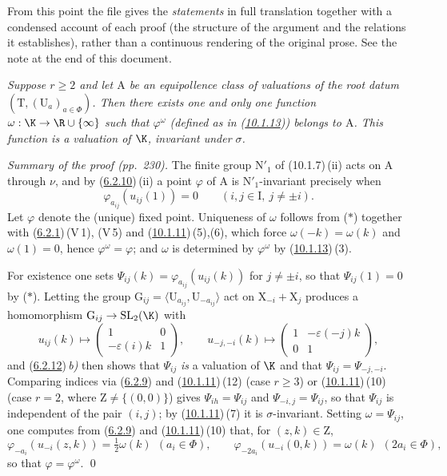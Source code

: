 \documentclass[12pt,a4paper,oneside,english]{smfart}
\makeatletter
\newcommand{\btanchor}[1]{\leavevmode\Hy@raisedlink{\hypertarget{bt:#1}{}}}
\newcommand{\btref}[1]{\hyperlink{bt:#1}{#1}}
\theoremstyle{definition}
\theoremstyle{bt}
\makeatother
\begin{document}

\btanchor{10.1.34}

\noindent\small
From this point the file gives the \emph{statements} in full translation
together with a condensed account of each proof (the structure of the argument
and the relations it establishes), rather than a continuous rendering of the
original prose. See the note at the end of this document.
\normalsize

\emph{Suppose $r\geqslant 2$ and let $\mathrm{A}$ be an equipollence class of
valuations of the root datum $(\mathrm{T},(\mathrm{U}_a)_{a\in\Phi})$. Then
there exists one and only one function $\omega:\K\to\R\cup\{\infty\}$ such that
$\varphi^{\omega}$ (defined as in (\btref{10.1.13})) belongs to $\mathrm{A}$. This
function is a valuation of $\K$, invariant under $\sigma$.}

\pf
\emph{Summary of the proof (pp.~230).} The finite group $\mathrm{N}'_1$ of
(10.1.7)\,(ii) acts on $\mathrm{A}$ through $\nu$, and by (\btref{6.2.10})\,(ii) a point
$\varphi$ of $\mathrm{A}$ is $\mathrm{N}'_1$-invariant precisely when
\[
\varphi_{a_{ij}}(u_{ij}(1))=0\qquad (i,j\in\mathrm{I},\ j\neq\pm i).
\tag{$*$}
\]
Let $\varphi$ denote the (unique) fixed point. Uniqueness of $\omega$ follows
from ($*$) together with (\btref{6.2.1})\,(V\,1), (V\,5) and (\btref{10.1.11})\,(5),(6), which
force $\omega(-k)=\omega(k)$ and $\omega(1)=0$, hence $\varphi^{\omega}=\varphi$;
and $\omega$ is determined by $\varphi^{\omega}$ by (\btref{10.1.13})\,(3).

For existence one sets $\Psi_{ij}(k)=\varphi_{a_{ij}}(u_{ij}(k))$ for
$j\neq\pm i$, so that $\Psi_{ij}(1)=0$ by ($*$). Letting the group
$\mathrm{G}_{ij}=\langle \mathrm{U}_{a_{ij}},\mathrm{U}_{-a_{ij}}\rangle$ act on
$\mathrm{X}_{-i}+\mathrm{X}_j$ produces a homomorphism
$\mathrm{G}_{ij}\to \mathrm{SL}_2(\K)$ with
\[
u_{ij}(k)\mapsto\begin{pmatrix}1&0\\-\varepsilon(i)k&1\end{pmatrix},
\qquad
u_{-j,-i}(k)\mapsto\begin{pmatrix}1&-\varepsilon(-j)k\\0&1\end{pmatrix},
\]
and (\btref{6.2.12})\,\emph{b)} then shows that $\Psi_{ij}$ \emph{is} a valuation of
$\K$ and that $\Psi_{ij}=\Psi_{-j,-i}$. Comparing indices via (\btref{6.2.9}) and
(\btref{10.1.11})\,(12) (case $r\geqslant 3$) or (\btref{10.1.11})\,(10) (case $r=2$, where
$\mathrm{Z}\neq\{(0,0)\}$) gives $\Psi_{ih}=\Psi_{ij}$ and
$\Psi_{-i,j}=\Psi_{ij}$, so that $\Psi_{ij}$ is independent of the pair $(i,j)$;
by (\btref{10.1.11})\,(7) it is $\sigma$-invariant. Setting $\omega=\Psi_{ij}$, one
computes from (\btref{6.2.9}) and (\btref{10.1.11})\,(10) that, for $(z,k)\in\mathrm{Z}$,
\[
\varphi_{-a_i}(u_{-i}(z,k))=\tfrac12\omega(k)\ \ (a_i\in\Phi),
\qquad
\varphi_{-2a_i}(u_{-i}(0,k))=\omega(k)\ \ (2a_i\in\Phi),
\]
so that $\varphi=\varphi^{\omega}$. \qed
\end{document}
